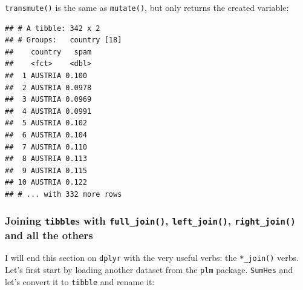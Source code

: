 \documentclass[]{gitbook}
\newenvironment{Shaded}{\begin{snugshade}}{\end{snugshade}}
\newcommand{\DataTypeTok}[1]{\textcolor[rgb]{0.13,0.29,0.53}{#1}}
\newcommand{\KeywordTok}[1]{\textcolor[rgb]{0.13,0.29,0.53}{\textbf{#1}}}
\newcommand{\NormalTok}[1]{#1}
\newcommand{\OperatorTok}[1]{\textcolor[rgb]{0.81,0.36,0.00}{\textbf{#1}}}
\newcommand{\StringTok}[1]{\textcolor[rgb]{0.31,0.60,0.02}{#1}}
\begin{document}
\texttt{transmute()} is the same as \texttt{mutate()}, but only returns the created variable:

\begin{Shaded}
\end{Shaded}

\begin{verbatim}
## # A tibble: 342 x 2
## # Groups:   country [18]
##    country   spam
##    <fct>    <dbl>
##  1 AUSTRIA 0.100 
##  2 AUSTRIA 0.0978
##  3 AUSTRIA 0.0969
##  4 AUSTRIA 0.0991
##  5 AUSTRIA 0.102 
##  6 AUSTRIA 0.104 
##  7 AUSTRIA 0.110 
##  8 AUSTRIA 0.113 
##  9 AUSTRIA 0.115 
## 10 AUSTRIA 0.122 
## # ... with 332 more rows
\end{verbatim}

\hypertarget{joining-tibbles-with-full_join-left_join-right_join-and-all-the-others}{%
\subsubsection{\texorpdfstring{Joining \texttt{tibble}s with \texttt{full\_join()}, \texttt{left\_join()}, \texttt{right\_join()} and all the others}{Joining tibbles with full\_join(), left\_join(), right\_join() and all the others}}\label{joining-tibbles-with-full_join-left_join-right_join-and-all-the-others}}

I will end this section on \texttt{dplyr} with the very useful verbs: the \texttt{*\_join()} verbs. Let's first
start by loading another dataset from the \texttt{plm} package. \texttt{SumHes} and let's convert it to \texttt{tibble}
and rename it:

\begin{Shaded}
\end{Shaded}
\end{document}
